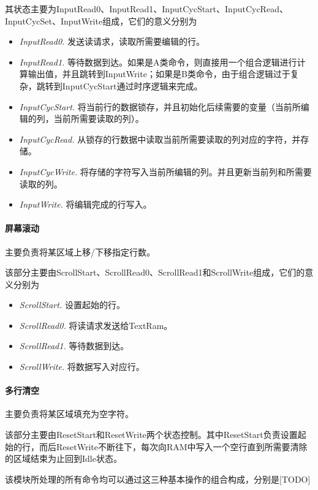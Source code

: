 其状态主要为InputRead0、InputRead1、InputCycStart、InputCycRead、InputCycSet、InputWrite组成，它们的意义分别为

\begin{itemize}
	\item \textit{InputRead0.} 发送读请求，读取所需要编辑的行。
	\item \textit{InputRead1.} 等待数据到达。如果是A类命令，则直接用一个组合逻辑进行计算输出值，并且跳转到InputWrite；如果是B类命令，由于组合逻辑过于复杂，跳转到InputCycStart通过时序逻辑来完成。
	\item \textit{InputCycStart.} 将当前行的数据锁存，并且初始化后续需要的变量（当前所编辑的列，当前所需要读取的列）。
	\item \textit{InputCycRead.} 从锁存的行数据中读取当前所需要读取的列对应的字符，并存储。
	\item \textit{InputCycWrite.} 将存储的字符写入当前所编辑的列。并且更新当前列和所需要读取的列。
	\item \textit{InputWrite.} 将编辑完成的行写入。
\end{itemize}

\paragraph{屏幕滚动}
主要负责将某区域上移/下移指定行数。

该部分主要由ScrollStart、ScrollRead0、ScrollRead1和ScrollWrite组成，它们的意义分别为

\begin{itemize}
	\item \textit{ScrollStart.} 设置起始的行。
	\item \textit{ScrollRead0.} 将读请求发送给TextRam。
	\item \textit{ScrollRead1.} 等待数据到达。
	\item \textit{ScrollWrite.} 将数据写入对应行。
\end{itemize}

\paragraph{多行清空}
主要负责将某区域填充为空字符。

该部分主要由ResetStart和ResetWrite两个状态控制。其中ResetStart负责设置起始的行，而后ResetWrite不断往下，每次向RAM中写入一个空行直到所需要清除的区域结束为止回到Idle状态。

该模块所处理的所有命令均可以通过这三种基本操作的组合构成，分别是[TODO]
